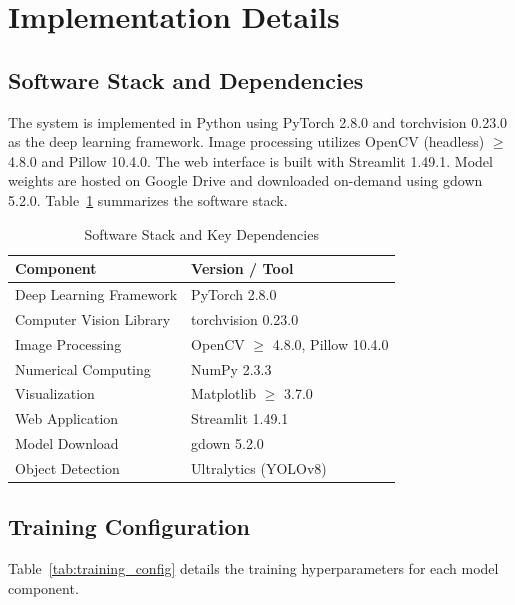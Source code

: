 \documentclass[conference]{IEEEtran}
\begin{document}
\section{Implementation Details}

\subsection{Software Stack and Dependencies}

The system is implemented in Python using PyTorch 2.8.0 and torchvision 0.23.0 as the deep learning framework. Image processing utilizes OpenCV (headless) $\geq$ 4.8.0 and Pillow 10.4.0. The web interface is built with Streamlit 1.49.1. Model weights are hosted on Google Drive and downloaded on-demand using gdown 5.2.0. Table~\ref{tab:software} summarizes the software stack.

\begin{table}[htbp]
\caption{Software Stack and Key Dependencies}
\label{tab:software}
\centering
\renewcommand{\arraystretch}{1.1}
\begin{tabular}{@{}ll@{}}
\toprule
\textbf{Component} & \textbf{Version / Tool} \\
\midrule
Deep Learning Framework  & PyTorch 2.8.0 \\
Computer Vision Library  & torchvision 0.23.0 \\
Image Processing         & OpenCV $\geq$ 4.8.0, Pillow 10.4.0 \\
Numerical Computing      & NumPy 2.3.3 \\
Visualization            & Matplotlib $\geq$ 3.7.0 \\
Web Application          & Streamlit 1.49.1 \\
Model Download           & gdown 5.2.0 \\
Object Detection         & Ultralytics (YOLOv8) \\
\bottomrule
\end{tabular}
\end{table}

\subsection{Training Configuration}

Table~\ref{tab:training_config} details the training hyperparameters for each model component.
\end{document}

